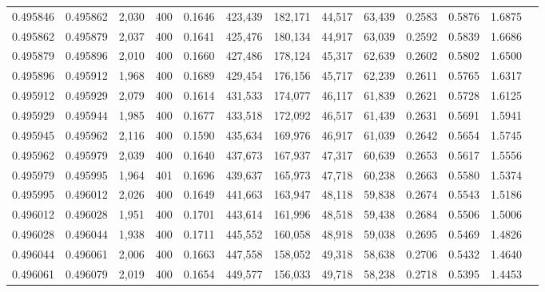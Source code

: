 \begin{tabular}{rrrrrrrrrrrrr}
0.495846 & 0.495862 &  2,030 & 400 &                                     0.1646 & 423,439 & 182,171 &  44,517 &  63,439 & 0.2583 & 0.5876 & 1.6875 \\
0.495862 & 0.495879 &  2,037 & 400 &                                     0.1641 & 425,476 & 180,134 &  44,917 &  63,039 & 0.2592 & 0.5839 & 1.6686 \\
0.495879 & 0.495896 &  2,010 & 400 &                                     0.1660 & 427,486 & 178,124 &  45,317 &  62,639 & 0.2602 & 0.5802 & 1.6500 \\
0.495896 & 0.495912 &  1,968 & 400 &                                     0.1689 & 429,454 & 176,156 &  45,717 &  62,239 & 0.2611 & 0.5765 & 1.6317 \\
0.495912 & 0.495929 &  2,079 & 400 &                                     0.1614 & 431,533 & 174,077 &  46,117 &  61,839 & 0.2621 & 0.5728 & 1.6125 \\
0.495929 & 0.495944 &  1,985 & 400 &                                     0.1677 & 433,518 & 172,092 &  46,517 &  61,439 & 0.2631 & 0.5691 & 1.5941 \\
0.495945 & 0.495962 &  2,116 & 400 &                                     0.1590 & 435,634 & 169,976 &  46,917 &  61,039 & 0.2642 & 0.5654 & 1.5745 \\
0.495962 & 0.495979 &  2,039 & 400 &                                     0.1640 & 437,673 & 167,937 &  47,317 &  60,639 & 0.2653 & 0.5617 & 1.5556 \\
0.495979 & 0.495995 &  1,964 & 401 &                                     0.1696 & 439,637 & 165,973 &  47,718 &  60,238 & 0.2663 & 0.5580 & 1.5374 \\
0.495995 & 0.496012 &  2,026 & 400 &                                     0.1649 & 441,663 & 163,947 &  48,118 &  59,838 & 0.2674 & 0.5543 & 1.5186 \\
0.496012 & 0.496028 &  1,951 & 400 &                                     0.1701 & 443,614 & 161,996 &  48,518 &  59,438 & 0.2684 & 0.5506 & 1.5006 \\
0.496028 & 0.496044 &  1,938 & 400 &                                     0.1711 & 445,552 & 160,058 &  48,918 &  59,038 & 0.2695 & 0.5469 & 1.4826 \\
0.496044 & 0.496061 &  2,006 & 400 &                                     0.1663 & 447,558 & 158,052 &  49,318 &  58,638 & 0.2706 & 0.5432 & 1.4640 \\
0.496061 & 0.496079 &  2,019 & 400 &                                     0.1654 & 449,577 & 156,033 &  49,718 &  58,238 & 0.2718 & 0.5395 & 1.4453 \\

\end{tabular}
